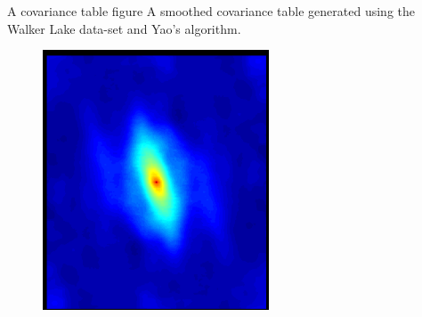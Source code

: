 \begin{frame}{A covariance table figure}
A smoothed covariance table generated using the Walker Lake data-set and Yao's algorithm.
\begin{figure}[!ht]
  \centering
    \includegraphics[height=0.4\textheight, width=0.6\textwidth]{figs/cov_table_fig.png}
    \label{cov_table_ex.fig}
\end{figure}

\end{frame}

